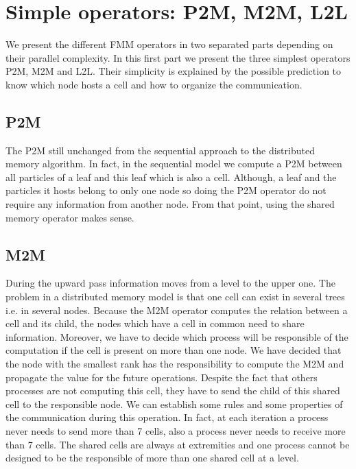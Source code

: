 \documentclass[12pt,letterpaper,titlepage]{report}
\begin{document}
\chapter{Simple operators: P2M, M2M, L2L}
We present the different FMM operators in two separated parts depending on their parallel complexity.
In this first part we present the three simplest operators P2M, M2M and L2L.
Their simplicity is explained by the possible prediction to know which node hosts a cell and how to organize the communication.
\section{P2M}
The P2M still unchanged from the sequential approach to the distributed memory algorithm.
In fact, in the sequential model we compute a P2M between all particles of a leaf and this leaf which is also a cell.
Although, a leaf and the particles it hosts belong to only one node so doing the P2M operator do not require any information from another node.
From that point, using the shared memory operator makes sense.
\section{M2M}
During the upward pass information moves from a level to the upper one.
The problem in a distributed memory model is that one cell can exist in several trees i.e. in several nodes.
Because the M2M operator computes the relation between a cell and its child, the nodes which have a cell in common need to share information.
Moreover, we have to decide which process will be responsible of the computation if the cell is present on more than one node.
We have decided that the node with the smallest rank has the responsibility to compute the M2M and propagate the value for the future operations.
Despite the fact that others processes are not computing this cell, they have to send the child of this shared cell to the responsible node.
We can establish some rules and some properties of the communication during this operation.
In fact, at each iteration a process never needs to send more than 7 cells, also a process never needs to receive more than 7 cells.
The shared cells are always at extremities and one process cannot be designed to be the responsible of more than one shared cell at a level.
\end{document}
